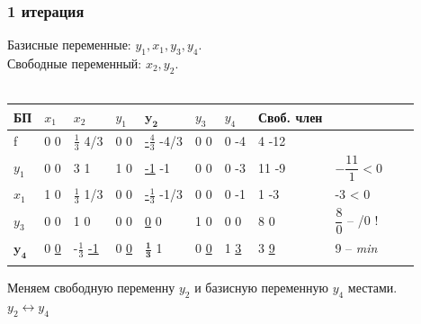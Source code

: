 \documentclass[14pt,a4paper,fleqn]{extarticle}
\begin{document}
\subsubsection*{1 итерация}
Базисные переменные: $y_1, x_1, y_3, y_4$.\\
Свободные переменный: $x_2, y_2$.\\\\
\begin{tabularx}{\textwidth}{|p{1cm}|p{1cm}|p{1cm}|p{1cm}V{6}p{1cm}V{7}p{1cm}|p{1cm}|p{1.2cm}|c}
	\hline
	БП & $x_1$ & $x_2$ & $y_1$ & $\boldsymbol{y_2}$ & $y_3$ & $y_4$ & Своб. член & \\
	\hline
	
	f & 0 \scriptsize 0 & \small $\frac{1}{3}$ \tiny 4/3 & 0 \scriptsize 0 & \underline{\small -$\frac{4}{3}$} \tiny -4/3 & 0 \scriptsize 0 & 0 \scriptsize -4 & 4 \scriptsize -12 & \\
	
	\hline
	
	$y_1$ & 0 \scriptsize 0 & 3 \scriptsize 1 & 1 \scriptsize 0 & \underline{-1} \scriptsize -1 & 0 \scriptsize 0 & 0 \scriptsize -3 & 11 \scriptsize -9 & $-\dfrac{11}{1} < 0$ \\
	
	\hline
	
	$x_1$ & 1 \scriptsize 0 & \small $\frac{1}{3}$ \scriptsize 1/3 & 0 \scriptsize 0 & \underline{\small -$\frac{1}{3}$} \tiny -1/3 & 0 \scriptsize 0 & 0 \scriptsize -1 & 1 \scriptsize -3 & -3 < 0 \\
	
	\hline
	$y_3$ & 0 \scriptsize 0 & 1 \scriptsize 0 & 0 \scriptsize 0 & \underline 0 \scriptsize 0 & 1 \scriptsize 0 & 0 \scriptsize 0 & 8 \scriptsize 0 & $\dfrac{8}{0}$ -- /0 ! \\
	
	\Xhline{6\arrayrulewidth}
	$\boldsymbol{y_4}$ & 0 \underline{\scriptsize 0} & \small -$\frac{1}{3}$ \underline{\scriptsize -1} & 0 \underline{\scriptsize 0} & \small $\boldsymbol{\frac{1}{3}}$ \scriptsize 1 & 0 \underline{\scriptsize 0} & 1 \scriptsize \underline 3 & 3 \underline{\scriptsize 9} & 9 -- \textit{min} \\
	\Xhline{7\arrayrulewidth}
\end{tabularx}
\newline\newline
Меняем свободную переменну $y_2$ и базисную переменную $y_4$ местами.\\
$y_2 \leftrightarrow y_4$
\end{document}
